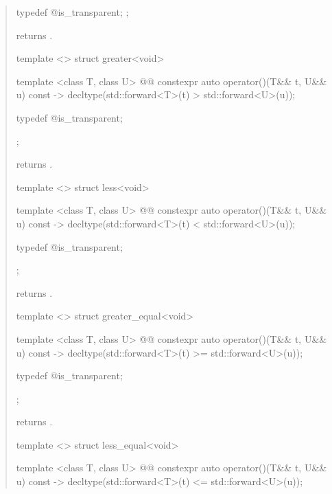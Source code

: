 \begin{quote}
\begin{itemdecl}
{  typedef @\unspec@ is_transparent;
};
\end{itemdecl}

\begin{itemdescr}
\pnum
{} returns .
\end{itemdescr}

%
\begin{itemdecl}
template <> struct greater<void> {
  template <class T, class U>
    @@
  constexpr auto operator()(T&& t, U&& u) const
    -> decltype(std::forward<T>(t) > std::forward<U>(u));

  typedef @\unspec@ is_transparent;
};
\end{itemdecl}

\begin{itemdescr}
\pnum
{} returns .
\end{itemdescr}

%
\begin{itemdecl}
template <> struct less<void> {
  template <class T, class U>
    @@
  constexpr auto operator()(T&& t, U&& u) const
    -> decltype(std::forward<T>(t) < std::forward<U>(u));

  typedef @\unspec@ is_transparent;
};
\end{itemdecl}

\begin{itemdescr}
\pnum
{} returns .
\end{itemdescr}

%
\begin{itemdecl}
template <> struct greater_equal<void> {
  template <class T, class U>
    @@
  constexpr auto operator()(T&& t, U&& u) const
    -> decltype(std::forward<T>(t) >= std::forward<U>(u));

  typedef @\unspec@ is_transparent;
};
\end{itemdecl}

\begin{itemdescr}
\pnum
{} returns .
\end{itemdescr}

%
\begin{itemdecl}
template <> struct less_equal<void> {
  template <class T, class U>
    @@
  constexpr auto operator()(T&& t, U&& u) const
    -> decltype(std::forward<T>(t) <= std::forward<U>(u));

}
\end{itemdecl}
\end{quote}
